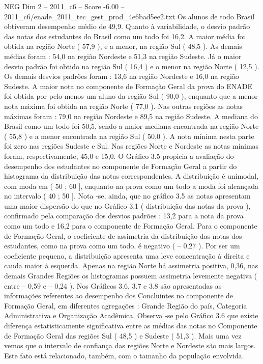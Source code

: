 \begin{textsample}{NEG Dim 2 – 2011\_c6 – Score -6.00 – 2011\_c6/enade\_2011\_tec\_gest\_prod\_4e6bad5ee2.txt}
Os alunos de todo Brasil obtiveram desempenho médio de 49,9.
Quanto à variabilidade, o desvio padrão das notas dos estudantes do Brasil como um todo foi 16,2.
A maior média foi obtida na região Norte ( 57,9 ), e a menor, na região Sul ( 48,5 ).
As demais médias foram : 54,0 na região Nordeste e 51,3 na região Sudeste.
Já o maior desvio padrão foi obtido na região Sul ( 16,4 ) e o menor na região Norte ( 12,5 ).
Os demais desvios padrões foram : 13,6 na região Nordeste e 16,0 na região Sudeste.
A maior nota no componente de Formação Geral da prova do ENADE foi obtida por pelo menos um aluno da região Sul ( 90,0 ), enquanto que a menor nota máxima foi obtida na região Norte ( 77,0 ).
Nas outras regiões as notas máximas foram : 79,0 na região Nordeste e 89,5 na região Sudeste.
A mediana do Brasil como um todo foi 50,5, sendo a maior mediana encontrada na região Norte ( 55,8 ) e a menor encontrada na região Sul ( 50,0 ).
A nota mínima nesta parte foi zero nas regiões Sudeste e Sul.
Nas regiões Norte e Nordeste as notas mínimas foram, respectivamente, 45,0 e 15,0.
O Gráfico 3.5 propicia a avaliação do desempenho dos estudantes no componente de Formação Geral a partir do histograma da distribuição das notas correspondentes.
A distribuição é unimodal, com moda em ( 50 ; 60 ], enquanto na prova como um todo a moda foi alcançada no intervalo ( 40 ; 50 ].
Nota -se, ainda, que no gráfico 3.5 as notas apresentam uma maior dispersão do que no Gráfico 3.1 ( distribuição das notas da prova ), confirmado pela comparação dos desvios padrões : 13,2 para a nota da prova como um todo e 16,2 para o componente de Formação Geral.
Para o componente de Formação Geral, o coeficiente de assimetria da distribuição das notas dos estudantes, como na prova como um todo, é negativo ( – 0,27 ).
Por ser um coeficiente pequeno, a distribuição apresenta uma leve concentração à direita e cauda maior à esquerda.
Apenas na região Norte há assimetria positiva, 0,36, nas demais Grandes Regiões os histogramas possuem assimetria levemente negativa ( entre – 0,59 e – 0,24 ).
Nos Gráficos 3.6, 3.7 e 3.8 são apresentadas as informações referentes ao desempenho dos Concluintes no componente de Formação Geral, em diferentes agregações : Grande Região do país, Categoria Administrativa e Organização Acadêmica.
Observa -se pelo Gráfico 3.6 que existe diferença estatisticamente significativa entre as médias das notas no Componente de Formação Geral das regiões Sul ( 48,5 ) e Sudeste ( 51,3 ).
Mais uma vez vemos que o intervalo de confiança das regiões Norte e Nordeste são mais largos.
Este fato está relacionado, também, com o tamanho da população envolvida.

\end{textsample}
